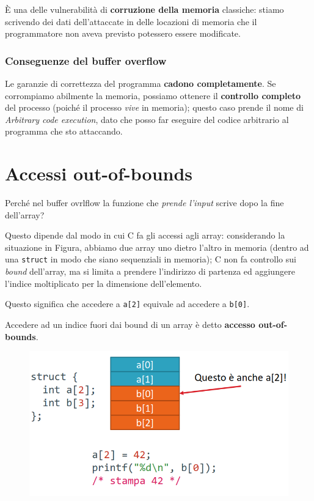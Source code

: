 È una delle vulnerabilità di \textbf{corruzione della memoria} classiche: stiamo scrivendo
dei dati dell'attaccate in delle locazioni di memoria che il programmatore
non aveva previsto potessero essere modificate.

\subsubsection{Conseguenze del buffer overflow}

Le garanzie di correttezza del programma \textbf{cadono completamente}. Se corrompiamo
abilmente la memoria, possiamo ottenere il \textbf{controllo completo} del processo
(poiché il processo \textit{vive} in memoria); questo caso prende il 
nome di \textit{Arbitrary code execution}, dato che posso far eseguire del 
codice arbitrario al programma che sto attaccando.

\section{Accessi out-of-bounds}
Perché nel buffer ovrlflow la funzione che \textit{prende l'input} scrive
dopo la fine dell'array?

Questo dipende dal modo in cui C fa gli accessi agli array: considerando la 
situazione in Figura, abbiamo due array uno dietro l'altro in memoria (dentro ad una \texttt{struct} 
in modo che siano sequenziali in memoria); C non fa controllo sui \textit{bound} dell'array, ma 
si limita a prendere l'indirizzo di partenza ed aggiungere l'indice moltiplicato per la dimensione 
dell'elemento.

Questo significa che accedere a \texttt{a[2]} equivale ad accedere a \texttt{b[0]}.

Accedere ad un indice fuori dai bound di un array è detto \textbf{accesso out-of-bounds}.

\begin{figure}[ht]
    \centering
    \includegraphics[width=0.75\linewidth]{images/out-bounds1.png}
    \label{fig:out-b1}
\end{figure}

